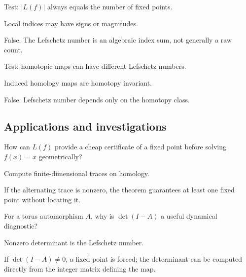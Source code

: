 \begin{exercise}\label{exr:viii35-ped-11}
Test: $|L(f)|$ always equals the number of fixed points.
\end{exercise}
\begin{hint}
Local indices may have signs or magnitudes.
\end{hint}
\begin{solution}
False. The Lefschetz number is an algebraic index sum, not generally a raw count.
\end{solution}

\begin{exercise}\label{exr:viii35-ped-12}
Test: homotopic maps can have different Lefschetz numbers.
\end{exercise}
\begin{hint}
Induced homology maps are homotopy invariant.
\end{hint}
\begin{solution}
False. Lefschetz number depends only on the homotopy class.
\end{solution}

\subsection*{Applications and investigations}

\begin{exercise}\label{exr:viii35-ped-13}
How can $L(f)$ provide a cheap certificate of a fixed point before solving $f(x)=x$ geometrically?
\end{exercise}
\begin{hint}
Compute finite-dimensional traces on homology.
\end{hint}
\begin{solution}
If the alternating trace is nonzero, the theorem guarantees at least one fixed point without locating it.
\end{solution}

\begin{exercise}\label{exr:viii35-ped-14}
For a torus automorphism $A$, why is $\det(I-A)$ a useful dynamical diagnostic?
\end{exercise}
\begin{hint}
Nonzero determinant is the Lefschetz number.
\end{hint}
\begin{solution}
If $\det(I-A)\ne0$, a fixed point is forced; the determinant can be computed directly from the integer matrix defining the map.
\end{solution}

